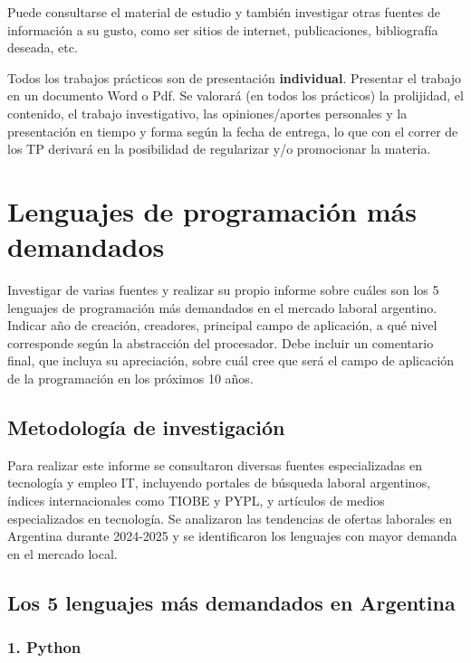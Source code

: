 \documentclass[12pt]{article}
\begin{document}
Puede consultarse el material de estudio y también investigar otras fuentes de información a su gusto, como ser sitios de internet, publicaciones, bibliografía deseada, etc.

Todos los trabajos prácticos son de presentación \textbf{individual}. Presentar el trabajo en un documento Word o Pdf. Se valorará (en todos los prácticos) la prolijidad, el contenido, el trabajo investigativo, las opiniones/aportes personales y la presentación en tiempo y forma según la fecha de entrega, lo que con el correr de los TP derivará en la posibilidad de regularizar y/o promocionar la materia.


\newpage
\section{Lenguajes de programación más demandados}

Investigar de varias fuentes y realizar su propio informe sobre cuáles son los 5 lenguajes de programación más demandados en el mercado laboral argentino. Indicar año de creación, creadores, principal campo de aplicación, a qué nivel corresponde según la abstracción del procesador. Debe incluir un comentario final, que incluya su apreciación, sobre cuál cree que será el campo de aplicación de la programación en los próximos 10 años.

\subsection{Metodología de investigación}

Para realizar este informe se consultaron diversas fuentes especializadas en tecnología y empleo IT, incluyendo portales de búsqueda laboral argentinos, índices internacionales como TIOBE y PYPL, y artículos de medios especializados en tecnología. Se analizaron las tendencias de ofertas laborales en Argentina durante 2024-2025 y se identificaron los lenguajes con mayor demanda en el mercado local.

\subsection{Los 5 lenguajes más demandados en Argentina}

\subsubsection{1. Python}
\end{document}

